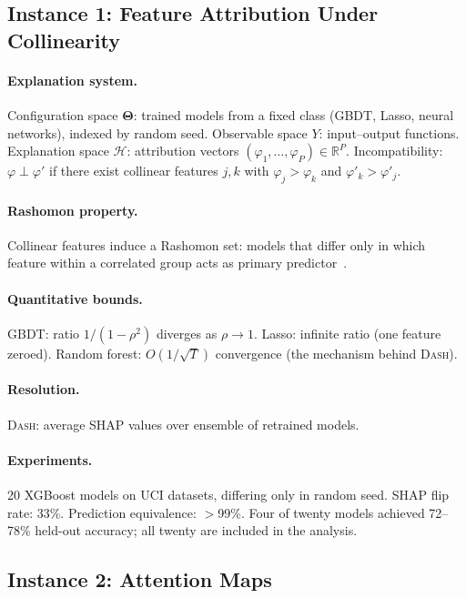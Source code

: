 \documentclass[11pt]{article}
\newcommand{\R}{\mathbb{R}}
\newcommand{\DASH}{\textsc{Dash}}
\newcommand{\Params}{\mathbf{\Theta}}
\newcommand{\sH}{\mathcal{H}}
\newcommand{\incomp}{\perp}
\begin{document}
\subsection{Instance 1: Feature Attribution Under Collinearity}

\paragraph{Explanation system.}
Configuration space $\Params$: trained models from a fixed class
(GBDT, Lasso, neural networks), indexed by random seed.
Observable space $Y$: input--output functions.
Explanation space $\sH$: attribution vectors
$(\varphi_1, \ldots, \varphi_P) \in \R^P$.
Incompatibility: $\varphi \incomp \varphi'$ if there exist collinear
features $j, k$ with $\varphi_j > \varphi_k$ and $\varphi'_k > \varphi'_j$.

\paragraph{Rashomon property.}
Collinear features induce a Rashomon set: models that differ only in
which feature within a correlated group acts as primary
predictor~\cite{damour2022underspecification, fisher2019models}.

\paragraph{Quantitative bounds.}
GBDT: ratio $1/(1-\rho^2)$ diverges as $\rho \to 1$.
Lasso: infinite ratio (one feature zeroed).
Random forest: $O(1/\sqrt{T})$ convergence (the mechanism behind
\DASH{}).

\paragraph{Resolution.}
\DASH{}: average SHAP values over ensemble of retrained models.

\paragraph{Experiments.}
20 XGBoost models on UCI datasets, differing only in random seed.
SHAP flip rate: 33\%. Prediction equivalence: $>$99\%.
Four of twenty models achieved 72--78\% held-out accuracy; all twenty are
included in the analysis.

\subsection{Instance 2: Attention Maps}
\end{document}
